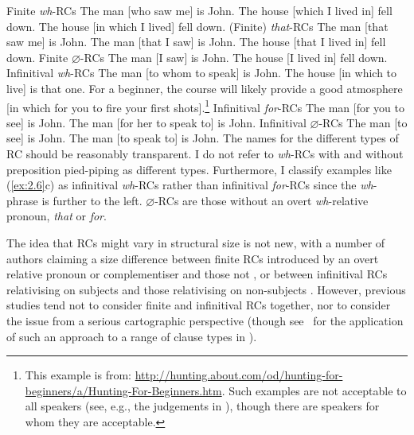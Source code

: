 \documentclass[output=paper]{langsci/langscibook}
\begin{document}
\ea\label{ex:2.3} Finite \emph{wh}-\glspl{RC}
    \ea    The man [who saw me] is John.
    \ex    The house [which I lived in] fell down.
    \ex    The house [in which I lived] fell down.
    \z
\ex\label{ex:2.4} (Finite) \emph{that}-\glspl{RC}
    \ea    The man [that saw me] is John.
    \ex    The man [that I saw] is John.
    \ex    The house [that I lived in] fell down.
    \z
\ex\label{ex:2.5} Finite $\varnothing$-\glspl{RC}
    \ea    The man [I saw] is John.
    \ex    The house [I lived in] fell down.
    \z
\ex\label{ex:2.6} Infinitival \emph{wh}-\glspl{RC}
    \ea    The man [to whom to speak] is John.
    \ex    The house [in which to live] is that one.
    \ex    For a beginner, the course will likely provide a good atmosphere [in
        which for you to fire your first shots].\footnote{This example is from:
        \url{http://hunting.about.com/od/hunting-for-beginners/a/Hunting-For-Beginners.htm}.
        Such examples are not acceptable to all speakers (see, e.g., the
        judgements in \citealt{ChomskyLasnik1977,Huddleston2002}), though there
        are speakers for whom they are acceptable.}
    \z
\ex\label{ex:2.7} Infinitival \emph{for}-\glspl{RC}
    \ea    The man [for you to see] is John.
    \ex    The man [for her to speak to] is John.
    \z
\ex\label{ex:2.8} Infinitival $\varnothing$-\glspl{RC}
    \ea    The man [to see] is John.
    \ex    The man [to speak to] is John.
    \z
\z
The names for the different types of \gls{RC} should be reasonably transparent. I do
not refer to \emph{wh}-\glspl{RC} with and without preposition pied-piping as
different types. Furthermore, I classify examples like (\ref{ex:2.6}c) as infinitival
\emph{wh}-\glspl{RC} rather than infinitival \emph{for}-\glspl{RC} since the
\emph{wh}-phrase is further to the left. $\varnothing${-\glspl{RC} are those without an
overt} \emph{wh}{-relative pronoun,} \emph{that} or \emph{for}.

The idea that \glspl{RC} might vary in structural size is not new, with a number of
authors claiming a size difference between finite \glspl{RC} introduced by an overt
relative pronoun or complementiser and those not \parencite{Boskovic1994,Boskovic1996,%
Boskovic1997,Boskovic2016,Weisler1980,Doherty1993,Doherty2000},
or between infinitival \glspl{RC} relativising on subjects and those
relativising on non-subjects \citep{Bhatt1999}. However, previous studies tend
not to consider finite and infinitival \glspl{RC} together, nor to consider the
issue from a serious cartographic perspective (though
see~\citealt{Haegeman2012} for the application of such an approach to a range
of clause types in ).
\end{document}
